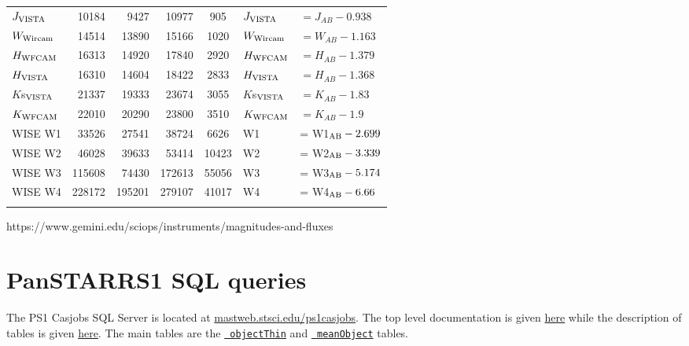 \documentclass[usenatbib]{mnras}
\begin{document}
\begin{table*}[h*]
\begin{center}
\begin{tabular}{l r r r  c l l}
      $J_{\rm VISTA} $     &     10184   &      9427   &    10977   &     905     &  $J_{\rm VISTA}  $     & $= J_{AB}    - 0.938  $         \\
      $W_{\rm Wircam}$   &    14514    &    13890   &    15166   &   1020    & $W_{\rm Wircam} $    & $= W_{AB}  -  1.163$           \\
      $H_{\rm WFCAM}$    &    16313     &    14920  &    17840   &   2920    & $H_{\rm WFCAM} $   & $= H_{AB}  - 1.379$          \\
      $H_{\rm VISTA}$      &    16310    &    14604   &    18422   &   2833     & $H_{\rm VISTA}$      & $= H_{AB}  - 1.368 $        \\
      $K$s$_{\rm VISTA}$     &    21337    &    19333  &    23674   &   3055     & $K$s$_{\rm VISTA}$      & $ = K_{AB} - 1.83  $          \\ 
      $K_{\rm WFCAM}$     &    22010     &    20290 &    23800   &   3510     & $K_{\rm WFCAM}$     & $ = K_{AB} - 1.9  $          \\ 
      WISE W1               &    33526    &    27541  &    38724   &    6626    & W1                        &   = W1$_{\rm AB} - 2.699$ \\
      WISE W2               &    46028    &    39633  &    53414   &  10423    & W2                        &   = W2$_{\rm AB} - 3.339$ \\
      WISE W3               &  115608    &    74430  &  172613   &  55056    & W3                        &   = W3$_{\rm AB} - 5.174$ \\
      WISE W4               &  228172    &  195201  &  279107   &  41017    & W4                        &   = W4$_{\rm AB} - 6.66$ \\
      \hline
      \hline
      \label{tab:filter_details}
    \end{tabular}
     \end{center}
\end{table*}
https://www.gemini.edu/sciops/instruments/magnitudes-and-fluxes

\section{PanSTARRS1 SQL queries}\label{sec:PS1_SQL}
The PS1 Casjobs SQL Server is located at
\href{http://mastweb.stsci.edu/ps1casjobs}{mastweb.stsci.edu/ps1casjobs}.
The top level documentation is given
\href{https://outerspace.stsci.edu/display/PANSTARRS/PS1+Source+extraction+and+catalogs}{here}
while the description of tables is given
\href{https://outerspace.stsci.edu/display/PANSTARRS/PS1+Source+extraction+and+catalogs#PS1Sourceextractionandcatalogs}{here}. The
main tables are the
\href{https://outerspace.stsci.edu/display/PANSTARRS/PS1+ObjectThin+table+fields}{{\tt
objectThin}} and
\href{https://outerspace.stsci.edu/display/PANSTARRS/PS1+MeanObject+table+fields}{{\tt
meanObject}} tables.
\end{document}
